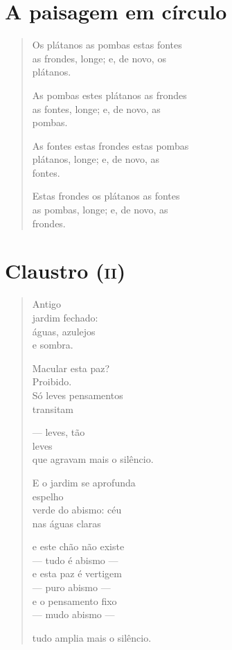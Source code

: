 \chapter{A paisagem em círculo}

\begin{verse}
Os plátanos as pombas estas fontes\\
as frondes, longe; e, de novo, os\\
\qquad\qquad\qquad\qquad\qquad\qquad\quad plátanos.

As pombas estes plátanos as frondes\\
as fontes, longe; e, de novo, as\\
\qquad\qquad\qquad\qquad\qquad\qquad\quad pombas.

As fontes estas frondes estas pombas\\
plátanos, longe; e, de novo, as\\
\qquad\qquad\qquad\qquad\qquad\qquad\quad fontes.

Estas frondes os plátanos as fontes\\
as pombas, longe; e, de novo, as\\
\qquad\qquad\qquad\qquad\qquad\qquad\quad frondes.
\end{verse}

\chapter{Claustro (\textsc{ii})}

\begin{verse}
Antigo\\
jardim fechado:\\
águas, azulejos\\
\qquad e sombra.

Macular esta paz?\\
\qquad Proibido.\\
Só leves pensamentos\\
\qquad transitam

--- leves, tão\\
\qquad leves\\
que agravam mais o silêncio.

E o jardim se aprofunda\\
\qquad\qquad\qquad\qquad espelho\\
verde do abismo: céu\\
nas águas claras

e este chão não existe\\
\quad --- tudo é abismo ---\\
e esta paz é vertigem\\
\quad --- puro abismo ---\\
e o pensamento fixo\\
\quad --- mudo abismo ---

tudo amplia mais o silêncio.
\end{verse}

